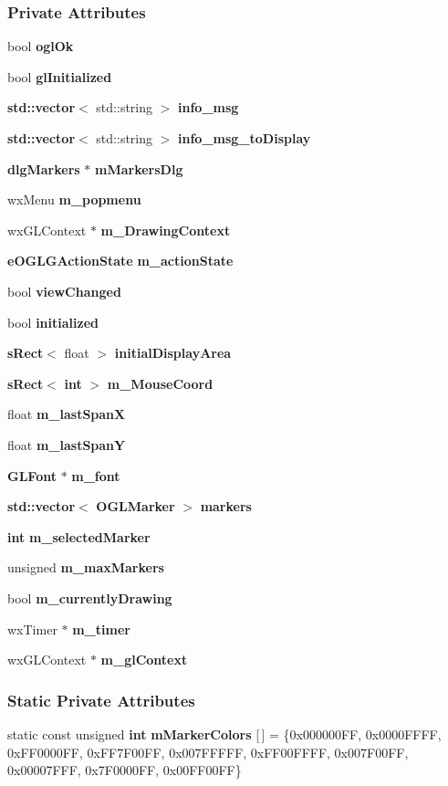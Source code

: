 \subsubsection*{Private Attributes}
\begin{DoxyCompactItemize}
\item 
bool {\bf ogl\+Ok}
\item 
bool {\bf gl\+Initialized}
\item 
{\bf std\+::vector}$<$ std\+::string $>$ {\bf info\+\_\+msg}
\item 
{\bf std\+::vector}$<$ std\+::string $>$ {\bf info\+\_\+msg\+\_\+to\+Display}
\item 
{\bf dlg\+Markers} $\ast$ {\bf m\+Markers\+Dlg}
\item 
wx\+Menu {\bf m\+\_\+popmenu}
\item 
wx\+G\+L\+Context $\ast$ {\bf m\+\_\+\+Drawing\+Context}
\item 
{\bf e\+O\+G\+L\+G\+Action\+State} {\bf m\+\_\+action\+State}
\item 
bool {\bf view\+Changed}
\item 
bool {\bf initialized}
\item 
{\bf s\+Rect}$<$ float $>$ {\bf initial\+Display\+Area}
\item 
{\bf s\+Rect}$<$ {\bf int} $>$ {\bf m\+\_\+\+Mouse\+Coord}
\item 
float {\bf m\+\_\+last\+SpanX}
\item 
float {\bf m\+\_\+last\+SpanY}
\item 
{\bf G\+L\+Font} $\ast$ {\bf m\+\_\+font}
\item 
{\bf std\+::vector}$<$ {\bf O\+G\+L\+Marker} $>$ {\bf markers}
\item 
{\bf int} {\bf m\+\_\+selected\+Marker}
\item 
unsigned {\bf m\+\_\+max\+Markers}
\item 
bool {\bf m\+\_\+currently\+Drawing}
\item 
wx\+Timer $\ast$ {\bf m\+\_\+timer}
\item 
wx\+G\+L\+Context $\ast$ {\bf m\+\_\+gl\+Context}
\end{DoxyCompactItemize}
\subsubsection*{Static Private Attributes}
\begin{DoxyCompactItemize}
\item 
static const unsigned {\bf int} {\bf m\+Marker\+Colors} [$\,$] = \{0x000000\+F\+F, 0x0000\+F\+F\+F\+F, 0x\+F\+F0000\+F\+F, 0x\+F\+F7\+F00\+F\+F, 0x007\+F\+F\+F\+F\+F, 0x\+F\+F00\+F\+F\+F\+F, 0x007\+F00\+F\+F, 0x00007\+F\+F\+F, 0x7\+F0000\+F\+F, 0x00\+F\+F00\+F\+F\}
\end{DoxyCompactItemize}

